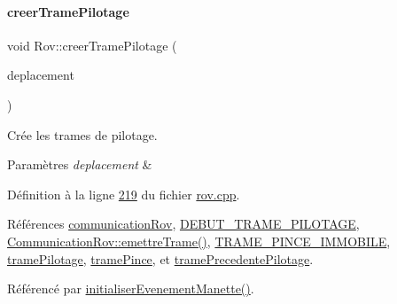 \paragraph{\texorpdfstring{creer\+Trame\+Pilotage}{creerTramePilotage}}
{\footnotesize\ttfamily void Rov\+::creer\+Trame\+Pilotage (\begin{DoxyParamCaption}\item[{Q\+String}]{deplacement }\end{DoxyParamCaption})\hspace{0.3cm}{\ttfamily [slot]}}



Crée les trames de pilotage. 


\begin{DoxyParams}{Paramètres}
{\em deplacement} & \\
\hline
\end{DoxyParams}


Définition à la ligne \hyperlink{rov_8cpp_source_l00219}{219} du fichier \hyperlink{rov_8cpp_source}{rov.\+cpp}.



Références \hyperlink{rov_8h_source_l00097}{communication\+Rov}, \hyperlink{rov_8h_source_l00040}{D\+E\+B\+U\+T\+\_\+\+T\+R\+A\+M\+E\+\_\+\+P\+I\+L\+O\+T\+A\+GE}, \hyperlink{communicationrov_8cpp_source_l00060}{Communication\+Rov\+::emettre\+Trame()}, \hyperlink{rov_8h_source_l00064}{T\+R\+A\+M\+E\+\_\+\+P\+I\+N\+C\+E\+\_\+\+I\+M\+M\+O\+B\+I\+LE}, \hyperlink{rov_8h_source_l00102}{trame\+Pilotage}, \hyperlink{rov_8h_source_l00105}{trame\+Pince}, et \hyperlink{rov_8h_source_l00103}{trame\+Precedente\+Pilotage}.



Référencé par \hyperlink{rov_8cpp_source_l00052}{initialiser\+Evenement\+Manette()}.



